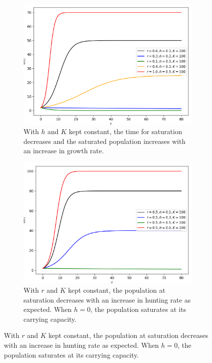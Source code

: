 \begin{figure}[H]
     \centering
     \begin{subfigure}[b]{0.45\textwidth}
         \centering
         \includegraphics[width=\textwidth]{Figures/5/5a/varyR.png}
         \caption{With $h$ and $K$ kept constant, the time for saturation decreases and the saturated population increases with an increase in growth rate.}
     \end{subfigure}
     \begin{subfigure}[b]{0.45\textwidth}
         \centering
         \includegraphics[width=\textwidth]{Figures/5/5a/varyH.png}
         \caption{With $r$ and $K$ kept constant, the population at saturation decreases with an increase in hunting rate as expected. When $h=0$, the population saturates at its carrying capacity.}

\end{subfigure}
\end{figure}
